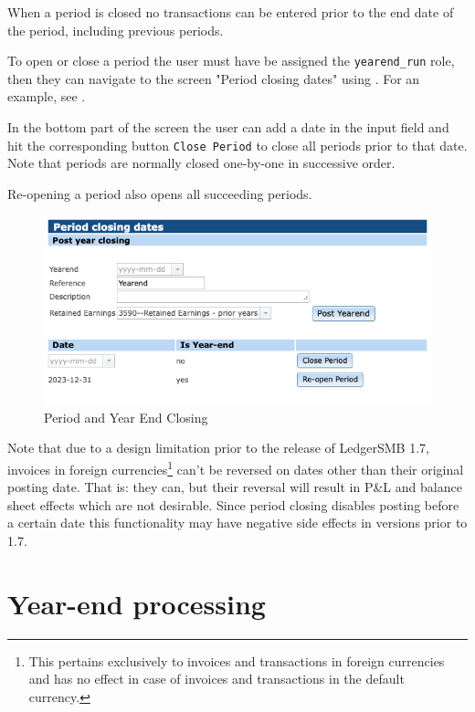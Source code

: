 When a period is closed no transactions can be entered prior to the end date of the period, including previous periods.

To open or close a period the user must have be assigned the \texttt{yearend\_run} role, then they can navigate to the screen "Period closing dates" using .
For an example, see .

In the bottom part of the screen the user can add a date
in the input field and hit the corresponding button \texttt{Close Period} to close all periods prior to that date.
Note that periods are normally closed one-by-one in successive order.

Re-opening a period also opens all succeeding periods.

\begin{figure}[ht]
	\centering
	\includegraphics[width=\graphicswidth]{images/gl-year-end-closing.png}
	\caption{Period and Year End Closing}
	\label{fig:sec-year-end-closing}
\end{figure}

Note that due to a design limitation prior to the release of LedgerSMB 1.7, 
invoices in foreign currencies\footnote{This pertains exclusively
	to invoices and transactions in foreign
	currencies and has no effect in case of invoices and transactions in the default
	currency.} can't be reversed on dates
other than their original posting date. That is: they can, but their
reversal will result in P\&L and balance sheet effects which are not desirable. 
Since period closing disables posting before a certain date this
functionality may have negative side effects in versions prior to 1.7.


\section{Year-end processing}
\label{sec-business-processes-accounting-year-end-processing}

